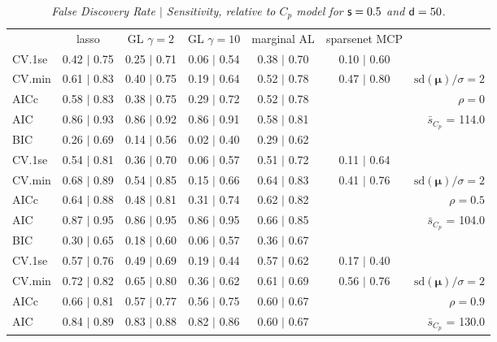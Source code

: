 \documentclass[12pt]{article}
\newcommand{\mr}[1]{\mathrm{#1}}
\newcommand{\bm}[1]{\mathbf{#1}}
\begin{document}
\begin{table}[p]\vspace{-.5cm}
\caption[l]{\label{sens}\it False Discovery Rate $\mid$ Sensitivity, relative to $C_p$ model  for ${\sf s}=0.5$ and ${\sf d}=50$.}
\vspace{-.5cm}
\small{}
\begin{center}
\begin{tabular}{l*{5}{c}|r}
 & lasso & GL $\gamma=2$ & GL $\gamma=10$ & marginal AL & sparsenet MCP  & \\
 \cline{1-7}
CV.1se & 0.42 $\mid$ 0.75 & 0.25 $\mid$ 0.71 & 0.06 $\mid$ 0.54 & 0.38 $\mid$ 0.70 & 0.10 $\mid$ 0.60 &\\
CV.min & 0.61 $\mid$ 0.83 & 0.40 $\mid$ 0.75 & 0.19 $\mid$ 0.64 & 0.52 $\mid$ 0.78 & 0.47 $\mid$ 0.80 &  $\mr{sd}(\bm{\mu})/\sigma=2$ \\
AICc & 0.58 $\mid$ 0.83 & 0.38 $\mid$ 0.75 & 0.29 $\mid$ 0.72 & 0.52 $\mid$ 0.78 & & $\rho=0$ \\
AIC & 0.86 $\mid$ 0.93 & 0.86 $\mid$ 0.92 & 0.86 $\mid$ 0.91 & 0.58 $\mid$ 0.81 & & \multirow{2}{*}{$\bar{s}_{C_p}$ = 114.0} \\
BIC & 0.26 $\mid$ 0.69 & 0.14 $\mid$ 0.56 & 0.02 $\mid$ 0.40 & 0.29 $\mid$ 0.62 & & \\
 \hline 
CV.1se & 0.54 $\mid$ 0.81 & 0.36 $\mid$ 0.70 & 0.06 $\mid$ 0.57 & 0.51 $\mid$ 0.72 & 0.11 $\mid$ 0.64 &\\
CV.min & 0.68 $\mid$ 0.89 & 0.54 $\mid$ 0.85 & 0.15 $\mid$ 0.66 & 0.64 $\mid$ 0.83 & 0.41 $\mid$ 0.76 &  $\mr{sd}(\bm{\mu})/\sigma=2$ \\
AICc & 0.64 $\mid$ 0.88 & 0.48 $\mid$ 0.81 & 0.31 $\mid$ 0.74 & 0.62 $\mid$ 0.82 & & $\rho=0.5$ \\
AIC & 0.87 $\mid$ 0.95 & 0.86 $\mid$ 0.95 & 0.86 $\mid$ 0.95 & 0.66 $\mid$ 0.85 & & \multirow{2}{*}{$\bar{s}_{C_p}$ = 104.0} \\
BIC & 0.30 $\mid$ 0.65 & 0.18 $\mid$ 0.60 & 0.06 $\mid$ 0.57 & 0.36 $\mid$ 0.67 & & \\
 \hline 
CV.1se & 0.57 $\mid$ 0.76 & 0.49 $\mid$ 0.69 & 0.19 $\mid$ 0.44 & 0.57 $\mid$ 0.62 & 0.17 $\mid$ 0.40 &\\
CV.min & 0.72 $\mid$ 0.82 & 0.65 $\mid$ 0.80 & 0.36 $\mid$ 0.62 & 0.61 $\mid$ 0.69 & 0.56 $\mid$ 0.76 &  $\mr{sd}(\bm{\mu})/\sigma=2$ \\
AICc & 0.66 $\mid$ 0.81 & 0.57 $\mid$ 0.77 & 0.56 $\mid$ 0.75 & 0.60 $\mid$ 0.67 & & $\rho=0.9$ \\
AIC & 0.84 $\mid$ 0.89 & 0.83 $\mid$ 0.88 & 0.82 $\mid$ 0.86 & 0.60 $\mid$ 0.67 & & \multirow{2}{*}{$\bar{s}_{C_p}$ = 130.0} \\

\end{tabular}
\end{center}
\end{table}
\end{document}
